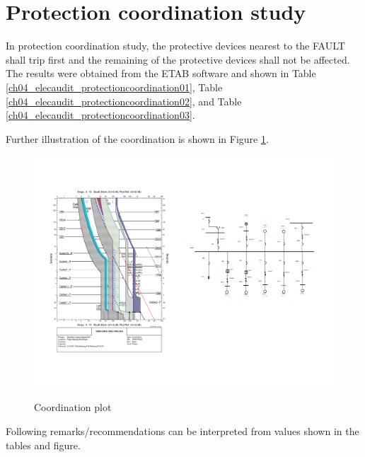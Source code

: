 %
\section{Protection coordination study} \label{ch04_elecaudit_protectioncoordination}
In protection coordination study, the protective devices nearest to the FAULT shall trip first and the remaining of the protective devices shall not be affected. The results were obtained from the ETAB software and shown in Table \ref{ch04_elecaudit_protectioncoordination01}, Table \ref{ch04_elecaudit_protectioncoordination02}, and Table \ref{ch04_elecaudit_protectioncoordination03}.









Further illustration of the coordination is shown in Figure \ref{fig_ch04_elecaudit_protection_coordination01}. 

\begin{figure}[]
	\includegraphics[width=\textwidth]{figures/fig_ch04_elecaudit_protection_coordination01.pdf} \\
	\caption{Coordination plot}
	\label{fig_ch04_elecaudit_protection_coordination01} 
\end{figure}

Following remarks/recommendations can be interpreted from values shown in the tables and figure.

